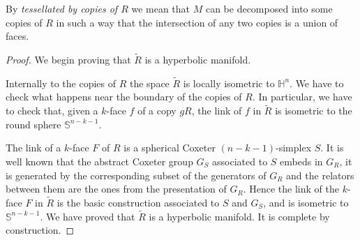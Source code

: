 \documentclass{amsart}
\theoremstyle{definition}
\theoremstyle{remark}
\newcommand{\matH} {\ensuremath {\mathbb{H}}}
\newcommand{\matS} {\ensuremath {\mathbb{S}}}
\begin{document}
By \emph{tessellated by copies of $R$} we mean that $M$ can be decomposed into some copies of $R$ in such a way that the intersection of any two copies is a union of faces.

\begin{proof}
    
    
    We begin proving that $\widetilde{R}$ is a hyperbolic manifold.

    Internally to the copies of $R$ the space $\widetilde{R}$ is locally isometric to $\matH^n$. We have to check what happens near the boundary of the copies of $R$. In particular, we have to check that, given a $k$-face $f$ of a copy $gR$, the link of $f$ in $\widetilde{R}$ is isometric to the round sphere $\matS^{n-k-1}$. %

    The link of a $k$-face $F$ of $R$ is a spherical Coxeter $(n-k-1)$-simplex $S$. %
    It is well known \cite[Section $4.1$]{D} that the abstract Coxeter group $G_S$ associated to $S$ embeds in $G_R$, it is generated by the corresponding subset of the generators of $G_R$ and the relators between them are the ones from the presentation of $G_R$.
    Hence the link of the $k$-face $F$ in $\widetilde{R}$ is the basic construction associated to $S$ and $G_S$, and is isometric to $\matS^{n-k-1}$. We have proved that $\widetilde{R}$ is a hyperbolic manifold. It is complete by construction.

        
        
    


\end{proof}
\end{document}
